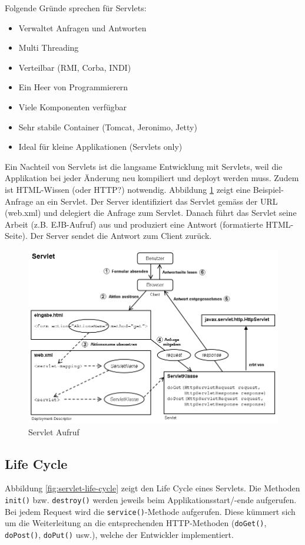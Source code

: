 Folgende Gründe sprechen für Servlets:

\begin{itemize}
	\item Verwaltet Anfragen und Antworten
	\item Multi Threading
	\item Verteilbar (RMI, Corba, INDI)
	\item Ein Heer von Programmierern
	\item Viele Komponenten verfügbar
	\item Sehr stabile Container (Tomcat, Jeronimo, Jetty)
	\item Ideal für kleine Applikationen (Servlets only)
\end{itemize}

Ein Nachteil von Servlets ist die langsame Entwicklung mit Servlets, weil die Applikation bei jeder Änderung neu kompiliert und deployt werden muss. Zudem ist HTML-Wissen (oder HTTP?) notwendig. Abbildung \ref{fig:servlet-aufruf} zeigt eine Beispiel-Anfrage an ein Servlet. Der Server identifiziert das Servlet gemäss der URL (web.xml) und delegiert die Anfrage zum Servlet. Danach führt das Servlet seine Arbeit (z.B. EJB-Aufruf) aus und produziert eine Antwort (formatierte HTML-Seite). Der Server sendet die Antwort zum Client zurück.

\begin{figure}
\centering
\includegraphics[width=0.7\linewidth]{fig/servlet-aufruf}
\caption{Servlet Aufruf}
\label{fig:servlet-aufruf}
\end{figure}

\subsection{Life Cycle}

Abbildung \ref{fig:servlet-life-cycle} zeigt den Life Cycle eines Servlets. Die Methoden \verb|init()| bzw. \verb|destroy()| werden jeweils beim Applikationsstart/-ende aufgerufen. Bei jedem Request wird die \verb|service()|-Methode aufgerufen. Diese kümmert sich um die Weiterleitung an die entsprechenden HTTP-Methoden (\verb|doGet()|, \verb|doPost()|, \verb|doPut()| usw.), welche der Entwickler implementiert.

